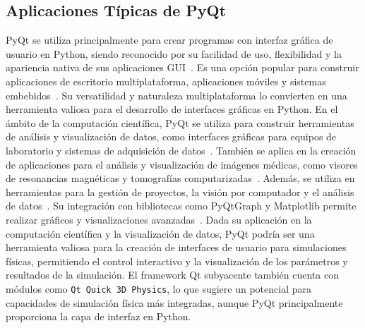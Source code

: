 \subsection{Aplicaciones Típicas de PyQt}
PyQt se utiliza principalmente para crear programas con interfaz gráfica de usuario en Python, siendo reconocido por su facilidad de uso, flexibilidad y la apariencia nativa de sus aplicaciones GUI~\cite{tutorialspoint_pyqt}. Es una opción popular para construir aplicaciones de escritorio multiplataforma, aplicaciones móviles y sistemas embebidos~\cite{ontosight_pyqt_basics}. Su versatilidad y naturaleza multiplataforma lo convierten en una herramienta valiosa para el desarrollo de interfaces gráficas en Python.
En el ámbito de la computación científica, PyQt se utiliza para construir herramientas de análisis y visualización de datos, como interfaces gráficas para equipos de laboratorio y sistemas de adquisición de datos~\cite{ontosight_pyqt_basics}. También se aplica en la creación de aplicaciones para el análisis y visualización de imágenes médicas, como visores de resonancias magnéticas y tomografías computarizadas~\cite{ontosight_pyqt_basics}. Además, se utiliza en herramientas para la gestión de proyectos, la visión por computador y el análisis de datos~\cite{ontosight_pyqt_basics}. Su integración con bibliotecas como PyQtGraph y Matplotlib permite realizar gráficos y visualizaciones avanzadas~\cite{qt_for_python}. Dada su aplicación en la computación científica y la visualización de datos, PyQt podría ser una herramienta valiosa para la creación de interfaces de usuario para simulaciones físicas, permitiendo el control interactivo y la visualización de los parámetros y resultados de la simulación. El framework Qt subyacente también cuenta con módulos como \texttt{Qt Quick 3D Physics}, lo que sugiere un potencial para capacidades de simulación física más integradas, aunque PyQt principalmente proporciona la capa de interfaz en Python.

